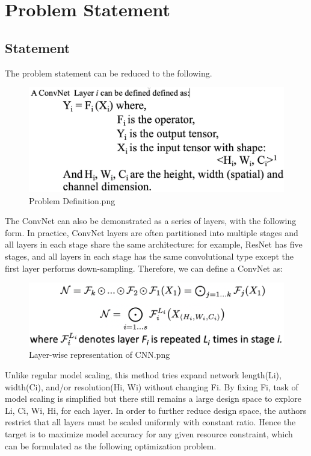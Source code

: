 \chapter{Problem Statement}
\section{Statement}

The problem statement can be reduced to the following.
\begin{figure}[htpb]
\centering
\includegraphics[width=\textwidth,height=\textheight,keepaspectratio]{../../static/Problem Definition.png}
\caption{Problem Definition.png}
\end{figure}The ConvNet can also be demonstrated as a series of layers, with the following form. In practice, ConvNet layers are often partitioned into multiple stages and all layers in each stage share the same architecture: for example, ResNet has five stages, and all layers in each stage has the same convolutional type except the first layer performs down-sampling. Therefore, we can define a ConvNet as:

\begin{figure}[htpb]
\centering
\includegraphics[width=\textwidth,height=\textheight,keepaspectratio]{../../static/Layer-wise representation of CNN.png}
\caption{Layer-wise representation of CNN.png}
\end{figure}Unlike regular model scaling, this method tries expand network length(Li), width(Ci), and/or resolution(Hi, Wi) without changing Fi. By fixing Fi, task of model scaling is simplified but there still remains a large design space to explore Li, Ci, Wi, Hi, for each layer. In order to further reduce design space, the authors restrict that all layers must be scaled uniformly with constant ratio. Hence the target is to maximize model accuracy for any given resource constraint, which can be formulated as the following optimization problem.





